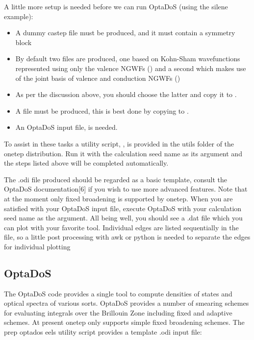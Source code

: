 \documentclass[letterpaper,10pt,english]{sphinxmanual}
\begin{document}
A little more setup is needed before we can run OptaDoS (using the silene
example):
\begin{itemize}
\item {} 
A dummy castep  file must be produced, and it must contain a symmetry block

\item {} 
By default two  files are produced, one based on Kohn-Sham wavefunctions represented using only the valence NGWFs () and a second which makes use of the joint basis of valence and conduction NGWFs ()

\item {} 
As per the discussion above, you should choose the latter and copy it to .

\item {} 
A  file must be produced, this is best done by copying  to .

\item {} 
An OptaDoS input file,  is needed.

\end{itemize}

To assist in these tasks a utility script, , is provided in the
utils folder of the onetep distribution. Run it with the calculation seed name
as its argument and the steps listed above will be completed automatically.

The .odi file produced should be regarded as a basic template, consult the
OptaDoS documentation{[}6{]} if you wish to use more advanced features. Note
that at the moment only fixed broadening is supported by onetep.
When you are satisfied with your OptaDoS input file, execute OptaDoS
with your calculation seed name as the argument. All being well, you should
see a .dat file which you can plot with your favorite tool. Individual edges are
listed sequentially in the file, so a little post processing with awk or python is
needed to separate the edges for individual plotting


\subsection{OptaDoS}
\label{\detokenize{eels_in_onetep:optados}}
The OptaDoS code provides a single tool to compute densities of states and
optical spectra of various sorts. OptaDoS provides a number of smearing
schemes for evaluating integrals over the Brillouin Zone including fixed and
adaptive schemes. At present onetep only supports simple fixed broadening
schemes. The prep optados eels utility script provides a template .odi input
file:
\end{document}
